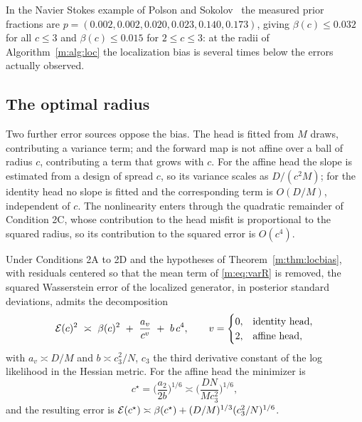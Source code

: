 In the Navier Stokes example of Polson and Sokolov~\cite{polsonsokolov2026} the measured prior fractions are $p=(0.002,0.002,0.020,0.023,0.140,0.173)$, giving $\beta(c)\le0.032$ for all $c\le3$ and $\beta(c)\le0.015$ for $2\le c\le3$: at the radii of Algorithm~\ref{m:alg:loc} the localization bias is several times below the errors actually observed.

\subsection{The optimal radius}

Two further error sources oppose the bias. The head is fitted from $M$ draws, contributing a variance term; and the forward map is not affine over a ball of radius $c$, contributing a term that grows with $c$. For the affine head the slope is estimated from a design of spread $c$, so its variance scales as $D/(c^2M)$; for the identity head no slope is fitted and the corresponding term is $O(D/M)$, independent of $c$. The nonlinearity enters through the quadratic remainder of Condition 2C, whose contribution to the head misfit is proportional to the squared radius, so its contribution to the squared error is $O(c^4)$.

\begin{proposition}\label{m:prop:radius}
Under Conditions 2A to 2D and the hypotheses of Theorem~\ref{m:thm:locbias}, with residuals centered so that the mean term of \eqref{m:eq:varR} is removed, the squared Wasserstein error of the localized generator, in posterior standard deviations, admits the decomposition
\begin{equation}\label{m:eq:decomp}
\mathcal{E}(c)^2\ \asymp\ \beta(c)^2\ +\ \frac{a_v}{c^{v}}\ +\ b\,c^4,\qquad v=\begin{cases}0,&\text{identity head},\\2,&\text{affine head},\end{cases}
\end{equation}
with $a_v\asymp D/M$ and $b\asymp c_3^2/N$, $c_3$ the third derivative constant of the log likelihood in the Hessian metric. For the affine head the minimizer is
\begin{equation}\label{m:eq:cstar}
c^\star=\Big(\frac{a_2}{2b}\Big)^{1/6}\asymp\Big(\frac{DN}{Mc_3^2}\Big)^{1/6},
\end{equation}
and the resulting error is $\mathcal{E}(c^\star)\asymp\beta(c^\star)+(D/M)^{1/3}(c_3^2/N)^{1/6}$.
\end{proposition}

